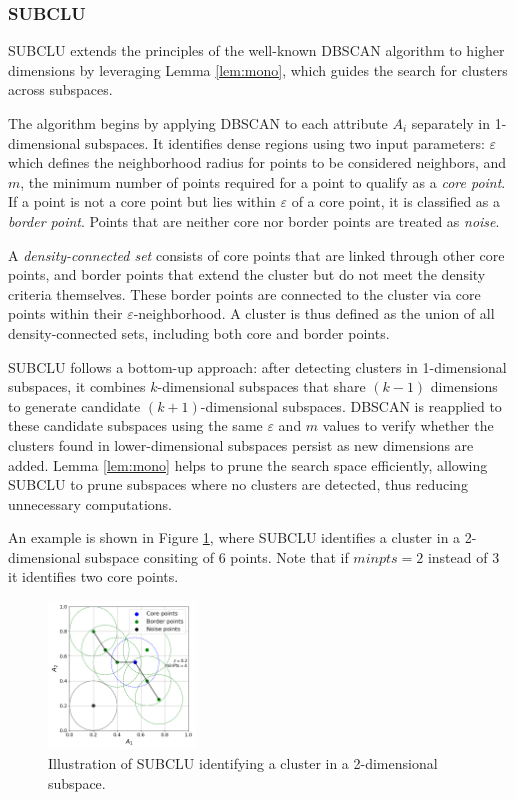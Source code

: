 \subsubsection{SUBCLU}
SUBCLU extends the principles of the well-known DBSCAN algorithm \cite{dbscan} to higher dimensions by leveraging Lemma \ref{lem:mono}, which guides the search for clusters across subspaces.

The algorithm begins by applying DBSCAN to each attribute $A_i$ separately in 1-dimensional subspaces. It identifies dense regions using two input parameters: $\varepsilon$ which defines the neighborhood radius for points to be considered neighbors, and $m$, the minimum number of points required for a point to qualify as a \textit{core point}. If a point is not a core point but lies within $\varepsilon$ of a core point, it is classified as a \textit{border point}. Points that are neither core nor border points are treated as \textit{noise}.

A \textit{density-connected set} consists of core points that are linked through other core points, and border points that extend the cluster but do not meet the density criteria themselves. These border points are connected to the cluster via core points within their $\varepsilon$-neighborhood. A cluster is thus defined as the union of all density-connected sets, including both core and border points.

SUBCLU follows a bottom-up approach: after detecting clusters in 1-dimensional subspaces, it combines $k$-dimensional subspaces that share $(k-1)$ dimensions to generate candidate $(k+1)$-dimensional subspaces. DBSCAN is reapplied to these candidate subspaces using the same $\varepsilon$ and $m$ values to verify whether the clusters found in lower-dimensional subspaces persist as new dimensions are added. Lemma \ref{lem:mono} helps to prune the search space efficiently, allowing SUBCLU to prune subspaces where no clusters are detected, thus reducing unnecessary computations.

An example is shown in Figure \ref{fig:subclu}, where SUBCLU identifies a cluster in a 2-dimensional subspace consiting of 6 points. Note that if $minpts = 2$ instead of 3 it identifies two core points.
\begin{figure}[H]
    \vspace*{-0.5cm}
    \centering
    \includegraphics[width=0.35\textwidth]{figures/subclu.png}
    \caption{Illustration of SUBCLU identifying a cluster in a 2-dimensional subspace.}
    \label{fig:subclu}
    \vspace*{-0.5cm}
\end{figure}